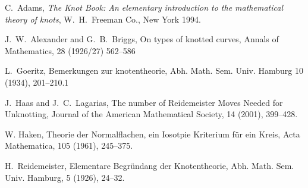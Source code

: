 \documentclass[12pt,letterpaper]{article}
\theoremstyle{definition}
\begin{document}
\begin{thebibliography}{9}

    C.~Adams, 
    \emph{The Knot Book: An elementary introduction to the mathematical theory of knots},
    W.~H.~Freeman Co., New York 1994.

    J.~W.~Alexander and G.~B.~Briggs,
    On types of knotted curves,
    Annals of Mathematics, 28 (1926/27) 562--586

    L.~Goeritz, Bemerkungen zur knotentheorie,
    Abh. Math. Sem. Univ. Hamburg 10 (1934), 201--210.1    

    J.~Haas and J.~C.~Lagarias, 
    The number of Reidemeister Moves Needed for Unknotting,
    Journal of the American Mathematical Society, 14 (2001), 399--428.

    W. Haken, 
    Theorie der Normalflachen, ein Iosotpie Kriterium f\"{u}r ein Kreis,
    Acta Mathematica, 105 (1961), 245--375.

    H.~Reidemeister,
    Elementare Begr\"{u}ndang der Knotentheorie,
    Abh. Math. Sem. Univ. Hamburg, 5 (1926), 24--32.
    

\end{thebibliography}
\end{document}
